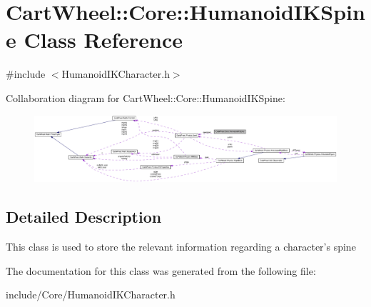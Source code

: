 \hypertarget{classCartWheel_1_1Core_1_1HumanoidIKSpine}{
\section{CartWheel::Core::HumanoidIKSpine Class Reference}
\label{classCartWheel_1_1Core_1_1HumanoidIKSpine}
}


{\ttfamily \#include $<$HumanoidIKCharacter.h$>$}



Collaboration diagram for CartWheel::Core::HumanoidIKSpine:\nopagebreak
\begin{figure}[H]
\begin{center}
\leavevmode
\includegraphics[width=400pt]{classCartWheel_1_1Core_1_1HumanoidIKSpine__coll__graph}
\end{center}
\end{figure}


\subsection{Detailed Description}
This class is used to store the relevant information regarding a character's spine 

The documentation for this class was generated from the following file:\begin{DoxyCompactItemize}
\item 
include/Core/HumanoidIKCharacter.h\end{DoxyCompactItemize}
